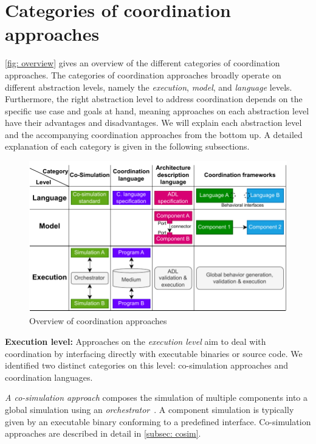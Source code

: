 \documentclass[runningheads]{llncs}
\begin{document}
\section{Categories of coordination approaches} \label{sec: approaches}

\autoref{fig: overview} gives an overview of the different categories of coordination approaches.
The categories of coordination approaches broadly operate on different abstraction levels, namely the \textit{execution}, \textit{model}, and \textit{language} levels.
Furthermore, the right abstraction level to address coordination depends on the specific use case and goals at hand, meaning approaches on each abstraction level have their advantages and disadvantages.
We will explain each abstraction level and the accompanying coordination approaches from the bottom up.
A detailed explanation of each category is given in the following subsections.

\begin{figure}[ht]
	\centering
	\includegraphics[width=1\textwidth]{images/overview}
	\caption{Overview of coordination approaches}
	\label{fig: overview}
\end{figure}

\textbf{Execution level:} Approaches on the \textit{execution level} aim to deal with coordination by interfacing directly with executable binaries or source code.
We identified two distinct categories on this level: co-simulation approaches and coordination languages.

\textit{A co-simulation approach} composes the simulation of multiple components into a global simulation using an \textit{orchestrator}~\cite{gomesCoSimulationSurvey2019}.
A component simulation is typically given by an executable binary conforming to a predefined interface.
Co-simulation approaches are described in detail in \autoref{subsec: cosim}.
\end{document}
